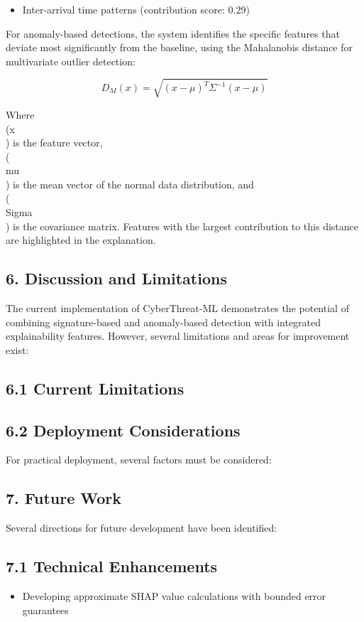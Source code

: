 \documentclass[12pt]{article}
\begin{document}
\begin{itemize}
\item Inter-arrival time patterns (contribution score: 0.29)
\end{itemize}

For anomaly-based detections, the system identifies the specific features that deviate most significantly from the baseline, using the Mahalanobis distance for multivariate outlier detection:

\begin{equation}
D_M(x) = \sqrt{(x - \mu)^T \Sigma^{-1} (x - \mu)}
\end{equation}

Where \\(x\\) is the feature vector, \\(\\mu\\) is the mean vector of the normal data distribution, and \\(\\Sigma\\) is the covariance matrix. Features with the largest contribution to this distance are highlighted in the explanation.

\subsection{6. Discussion and Limitations}
The current implementation of CyberThreat-ML demonstrates the potential of combining signature-based and anomaly-based detection with integrated explainability features. However, several limitations and areas for improvement exist:

\subsection{6.1 Current Limitations}
\subsection{6.2 Deployment Considerations}
For practical deployment, several factors must be considered:

\subsection{7. Future Work}
Several directions for future development have been identified:

\subsection{7.1 Technical Enhancements}
\begin{itemize}
\item Developing approximate SHAP value calculations with bounded error guarantees
\end{itemize}
\end{document}
